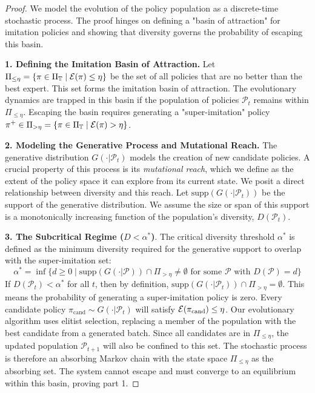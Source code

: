 \begin{proof}
We model the evolution of the policy population as a discrete-time stochastic process. The proof hinges on defining a "basin of attraction" for imitation policies and showing that diversity governs the probability of escaping this basin.

\noindent\textbf{1. Defining the Imitation Basin of Attraction.}
Let $\Pi_{\le \eta} = \{ \pi \in \Pi_{\mathbb{T}} \mid \mathcal{E}(\pi) \le \eta \}$ be the set of all policies that are no better than the best expert. This set forms the imitation basin of attraction. The evolutionary dynamics are trapped in this basin if the population of policies $\mathcal{P}_t$ remains within $\Pi_{\le \eta}$. Escaping the basin requires generating a "super-imitation" policy $\pi^+ \in \Pi_{> \eta} = \{ \pi \in \Pi_{\mathbb{T}} \mid \mathcal{E}(\pi) > \eta \}$.

\noindent\textbf{2. Modeling the Generative Process and Mutational Reach.}
The generative distribution $G(\cdot | \mathcal{P}_t)$ models the creation of new candidate policies. A crucial property of this process is its \emph{mutational reach}, which we define as the extent of the policy space it can explore from its current state. We posit a direct relationship between diversity and this reach. Let $\text{supp}(G(\cdot|\mathcal{P}_t))$ be the support of the generative distribution. We assume the size or span of this support is a monotonically increasing function of the population's diversity, $D(\mathcal{P}_t)$.

\noindent\textbf{3. The Subcritical Regime ($D < \alpha^*$)}.
The critical diversity threshold $\alpha^*$ is defined as the minimum diversity required for the generative support to overlap with the super-imitation set:
\[ \alpha^* = \inf \{ d \ge 0 \mid \text{supp}(G(\cdot|\mathcal{P})) \cap \Pi_{> \eta} \neq \emptyset \text{ for some } \mathcal{P} \text{ with } D(\mathcal{P}) = d \} \]
If $D(\mathcal{P}_t) < \alpha^*$ for all $t$, then by definition, $\text{supp}(G(\cdot|\mathcal{P}_t)) \cap \Pi_{> \eta} = \emptyset$. This means the probability of generating a super-imitation policy is zero. Every candidate policy $\pi_{\text{cand}} \sim G(\cdot | \mathcal{P}_t)$ will satisfy $\mathcal{E}(\pi_{\text{cand}}) \le \eta$.
Our evolutionary algorithm uses elitist selection, replacing a member of the population with the best candidate from a generated batch. Since all candidates are in $\Pi_{\le \eta}$, the updated population $\mathcal{P}_{t+1}$ will also be confined to this set. The stochastic process is therefore an absorbing Markov chain with the state space $\Pi_{\le \eta}$ as the absorbing set. The system cannot escape and must converge to an equilibrium within this basin, proving part 1.


\end{proof}
